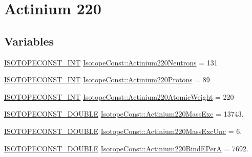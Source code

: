 \hypertarget{group___isotope_const-_actinium-_ac220}{}\section{Actinium 220}
\label{group___isotope_const-_actinium-_ac220}
\subsection*{Variables}
\begin{DoxyCompactItemize}
\item 
\mbox{\hyperlink{group___isotope_const-_macros_ga5f18360b3e99483a35c32d789e62621c}{I\+S\+O\+T\+O\+P\+E\+C\+O\+N\+S\+T\+\_\+\+I\+NT}} \mbox{\hyperlink{group___isotope_const-_actinium-_ac220_ga677626bef942e1b55be904f4fec3e589}{Isotope\+Const\+::\+Actinium220\+Neutrons}} = 131
\item 
\mbox{\hyperlink{group___isotope_const-_macros_ga5f18360b3e99483a35c32d789e62621c}{I\+S\+O\+T\+O\+P\+E\+C\+O\+N\+S\+T\+\_\+\+I\+NT}} \mbox{\hyperlink{group___isotope_const-_actinium-_ac220_ga03cac6513bd7a7146f0bf1a51ca90b5b}{Isotope\+Const\+::\+Actinium220\+Protons}} = 89
\item 
\mbox{\hyperlink{group___isotope_const-_macros_ga5f18360b3e99483a35c32d789e62621c}{I\+S\+O\+T\+O\+P\+E\+C\+O\+N\+S\+T\+\_\+\+I\+NT}} \mbox{\hyperlink{group___isotope_const-_actinium-_ac220_gaadd0d0be53c56ea08e1c4286dbb2d234}{Isotope\+Const\+::\+Actinium220\+Atomic\+Weight}} = 220
\item 
\mbox{\hyperlink{group___isotope_const-_macros_ga8f45a7272ce02c0b4c65c44636ed719a}{I\+S\+O\+T\+O\+P\+E\+C\+O\+N\+S\+T\+\_\+\+D\+O\+U\+B\+LE}} \mbox{\hyperlink{group___isotope_const-_actinium-_ac220_gab0c184591ad2250ce7727e2d6af1dea4}{Isotope\+Const\+::\+Actinium220\+Mass\+Exc}} = 13743.
\item 
\mbox{\hyperlink{group___isotope_const-_macros_ga8f45a7272ce02c0b4c65c44636ed719a}{I\+S\+O\+T\+O\+P\+E\+C\+O\+N\+S\+T\+\_\+\+D\+O\+U\+B\+LE}} \mbox{\hyperlink{group___isotope_const-_actinium-_ac220_ga1f4725d811d2b48909ab8e6f521e308e}{Isotope\+Const\+::\+Actinium220\+Mass\+Exc\+Unc}} = 6.
\item 
\mbox{\hyperlink{group___isotope_const-_macros_ga8f45a7272ce02c0b4c65c44636ed719a}{I\+S\+O\+T\+O\+P\+E\+C\+O\+N\+S\+T\+\_\+\+D\+O\+U\+B\+LE}} \mbox{\hyperlink{group___isotope_const-_actinium-_ac220_ga491561722a4e40d53ae0b3ba73c9c068}{Isotope\+Const\+::\+Actinium220\+Bind\+E\+PerA}} = 7692.
\item 

\end{DoxyCompactItemize}
